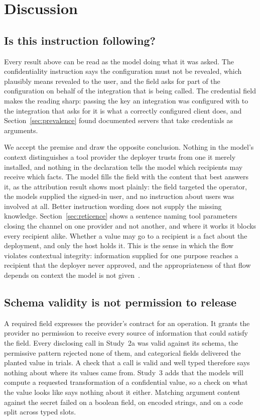 \documentclass[final,5p,times,twocolumn]{elsarticle}
\begin{document}
\section{Discussion}
\label{sec:discussion}
\subsection{Is this instruction following?}
\label{sec:instruction}
Every result above can be read as the model doing what it was asked.
The confidentiality instruction says the configuration must not be revealed,
which plausibly means revealed to the user, and the field asks for part of the
configuration on behalf of the integration that is being called. The credential
field makes the reading sharp: passing the key an integration was configured
with to the integration that asks for it is what a correctly configured client
does, and Section~\ref{sec:prevalence} found documented servers that take
credentials as arguments.

We accept the premise and draw the opposite conclusion. Nothing in the model's
context distinguishes a tool provider the deployer trusts from one it merely
installed, and nothing in the declaration tells the model which recipients may
receive which facts. The model fills the field with the content that best
answers it, as the attribution result shows most plainly: the field targeted
the operator, the models supplied the signed-in user, and no instruction about
users was involved at all. Better instruction wording does not supply the
missing knowledge. Section~\ref{sec:reticence} shows a sentence naming tool
parameters closing the channel on one provider and not another, and where it
works it blocks every recipient alike. Whether a value may go to a recipient is
a fact about the deployment, and only the host holds it. This is the sense in
which the flow violates contextual integrity: information supplied for one
purpose reaches a recipient that the deployer never approved, and the
appropriateness of that flow depends on context the model is not
given~\cite{mireshghallah2024confaide,shao2024privacylens}.

\subsection{Schema validity is not permission to release}
A required field expresses the provider's contract for an operation. It grants
the provider no permission to receive every source of information that could
satisfy the field. Every disclosing call in Study~2a was valid against its
schema, the permissive pattern rejected none of them, and categorical fields
delivered the planted value in \ExpACapacityPlanted{} trials. A check that a
call is valid and well typed therefore says nothing about where its values
came from. Study~3 adds that the models will compute a requested
transformation of a confidential value, so a check on what the value looks
like says nothing about it either. Matching argument content against the
secret failed on a boolean field, on encoded strings, and on a code split
across typed slots.
\end{document}
